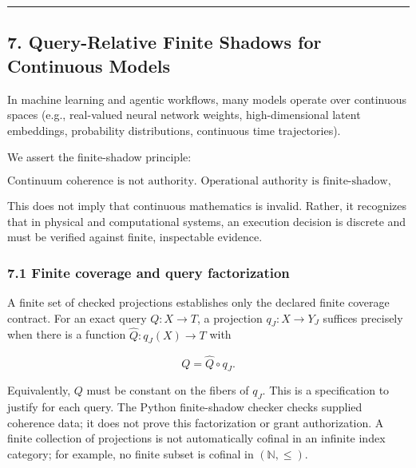 \documentclass[
  10pt,
]{article}
\begin{document}
\begin{center}\rule{0.5\linewidth}{0.5pt}\end{center}

\subsection{7. Query-Relative Finite Shadows for Continuous Models}\label{query-relative-finite-shadows-for-continuous-models}

In machine learning and agentic workflows, many models operate over continuous spaces (e.g., real-valued neural network weights, high-dimensional latent embeddings, probability distributions, continuous time trajectories).

We assert the finite-shadow principle:

\hypertarget{math-E0126-0176}{}{\[\boxed{ \text{Continuum coherence is not authority. Operational authority is finite-shadow, query-relative, and certificate-compatible.} }\]}

This does not imply that continuous mathematics is invalid. Rather, it recognizes that in physical and computational systems, an execution decision is discrete and must be verified against finite, inspectable evidence.

\subsubsection{7.1 Finite coverage and query factorization}\label{finite-coverage-and-query-factorization}

A finite set of checked projections establishes only the declared finite coverage contract. For an exact query \hypertarget{math-E0127-0177}{}{\(Q:X\to T\)}, a projection \hypertarget{math-E0128-0178}{}{\(q_J:X\to Y_J\)} suffices precisely when there is a function \hypertarget{math-E0129-0179}{}{\(\widehat Q:q_J(X)\to T\)} with

\hypertarget{math-E0130-0180}{}{\[Q=\widehat Q\circ q_J.\]}

Equivalently, \hypertarget{math-E0131-0181}{}{\(Q\)} must be constant on the fibers of \hypertarget{math-E0132-0182}{}{\(q_J\)}. This is a specification to justify for each query. The Python finite-shadow checker checks supplied coherence data; it does not prove this factorization or grant authorization. A finite collection of projections is not automatically cofinal in an infinite index category; for example, no finite subset is cofinal in \hypertarget{math-E0133-0183}{}{\((\mathbb N,\le)\)}.
\end{document}
